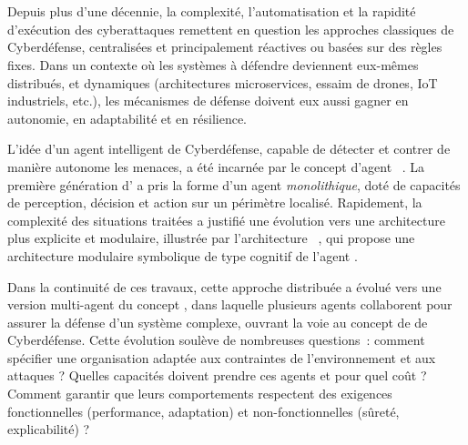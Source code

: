 \clearpage
\thispagestyle{empty}
\null
\newpage

\cleardoublepage
{}
\cleardoublepage
{}

\

\vspace{1em}

\bigskip

\\

\noindent
Depuis plus d'une décennie, la complexité, l'automatisation et la rapidité d'exécution des cyberattaques remettent en question les approches classiques de Cyberdéfense, centralisées et principalement réactives ou basées sur des règles fixes. Dans un contexte où les systèmes à défendre deviennent eux-mêmes distribués, et dynamiques (architectures microservices, essaim de drones, IoT industriels, etc.), les mécanismes de défense doivent eux aussi gagner en autonomie, en adaptabilité et en résilience.

L'idée d'un agent intelligent de Cyberdéfense, capable de détecter et contrer de manière autonome les menaces, a été incarnée par le concept d'agent ~\cite{Kott2023}. La première génération d' a pris la forme d'un agent \textit{monolithique}, doté de capacités de perception, décision et action sur un périmètre localisé. Rapidement, la complexité des situations traitées a justifié une évolution vers une architecture plus explicite et modulaire, illustrée par l'architecture ~\cite{Kott2023}, qui propose une architecture modulaire symbolique de type cognitif de l'agent .

Dans la continuité de ces travaux, cette approche distribuée a évolué vers une version multi-agent du concept , dans laquelle plusieurs agents collaborent pour assurer la défense d'un système complexe, ouvrant la voie au concept de  de Cyberdéfense. Cette évolution soulève de nombreuses questions~: comment spécifier une organisation adaptée aux contraintes de l'environnement et aux attaques ? Quelles capacités doivent prendre ces agents et pour quel coût ? Comment garantir que leurs comportements respectent des exigences fonctionnelles (performance, adaptation) et non-fonctionnelles (sûreté, explicabilité) ?

